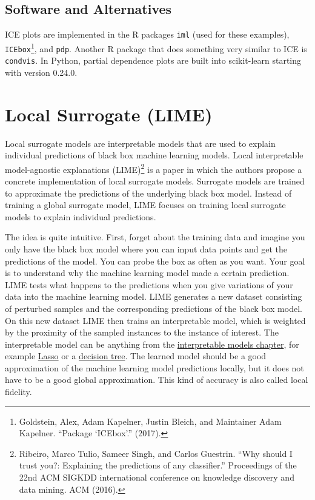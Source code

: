 \documentclass[
  11pt,
]{scrbook}
\begin{document}
\hypertarget{software-and-alternatives-2}{%
\subsection{Software and Alternatives}\label{software-and-alternatives-2}}

ICE plots are implemented in the R packages \texttt{iml} (used for these examples), \texttt{ICEbox}\footnote{Goldstein, Alex, Adam Kapelner, Justin Bleich, and Maintainer Adam Kapelner. ``Package `ICEbox'.'' (2017).}, and \texttt{pdp}.
Another R package that does something very similar to ICE is \texttt{condvis}. In Python, partial dependence plots are built into scikit-learn starting with version 0.24.0.

\newpage

\hypertarget{lime}{%
\section{Local Surrogate (LIME)}\label{lime}}

Local surrogate models are interpretable models that are used to explain individual predictions of black box machine learning models.
Local interpretable model-agnostic explanations (LIME)\footnote{Ribeiro, Marco Tulio, Sameer Singh, and Carlos Guestrin. ``Why should I trust you?: Explaining the predictions of any classifier.'' Proceedings of the 22nd ACM SIGKDD international conference on knowledge discovery and data mining. ACM (2016).} is a paper in which the authors propose a concrete implementation of local surrogate models.
Surrogate models are trained to approximate the predictions of the underlying black box model.
Instead of training a global surrogate model, LIME focuses on training local surrogate models to explain individual predictions.

The idea is quite intuitive.
First, forget about the training data and imagine you only have the black box model where you can input data points and get the predictions of the model.
You can probe the box as often as you want.
Your goal is to understand why the machine learning model made a certain prediction.
LIME tests what happens to the predictions when you give variations of your data into the machine learning model.
LIME generates a new dataset consisting of perturbed samples and the corresponding predictions of the black box model.
On this new dataset LIME then trains an interpretable model, which is weighted by the proximity of the sampled instances to the instance of interest.
The interpretable model can be anything from the \protect\hyperlink{simple}{interpretable models chapter}, for example \protect\hyperlink{lasso}{Lasso} or a \protect\hyperlink{tree}{decision tree}.
The learned model should be a good approximation of the machine learning model predictions locally, but it does not have to be a good global approximation.
This kind of accuracy is also called local fidelity.
\end{document}
